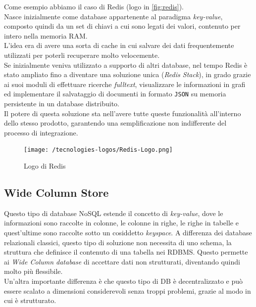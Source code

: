 \noindent Come esempio abbiamo il caso di Redis \cite{site:udemyredis} (logo in \autoref{fig:redis}).\\
Nasce inizialmente come database appartenente al paradigma \textit{key-value}, composto quindi da un set di chiavi a cui sono legati dei valori, contenuto per intero nella memoria RAM.\\
L'idea era di avere una sorta di cache in cui salvare dei dati frequentemente utilizzati per poterli recuperare molto velocemente.\\
Se inizialmente veniva utilizzato a supporto di altri database, nel tempo Redis è stato ampliato fino a diventare una soluzione unica (\textit{Redis Stack}), in grado grazie ai suoi moduli di effettuare ricerche \textit{fulltext}, visualizzare le informazioni in grafi ed implementare il salvataggio di documenti in formato \texttt{JSON} su memoria persistente in un \gls{database distribuito}.\\
Il potere di questa soluzione sta nell'avere tutte queste funzionalità all'interno dello stesso prodotto, garantendo una semplificazione non indifferente del processo di integrazione.

\begin{figure}[htbp]
\begin{center}
\texttt{[image: /tecnologies-logos/Redis-Logo.png]}
\caption{Logo di Redis}
\label{fig:redis}
\end{center}
\end{figure}

\subsection{Wide Column Store}
Questo tipo di database NoSQL estende il concetto di \textit{key-value}, dove le informazioni sono raccolte in colonne, le colonne in righe, le righe in tabelle e quest'ultime sono raccolte sotto un cosiddetto \textit{keyspace}. A differenza dei database relazionali classici, questo tipo di soluzione non necessita di uno schema, la struttura che definisce il contenuto di una tabella nei RDBMS. Questo permette ai \textit{Wide Column database} di accettare dati non strutturati, diventando quindi molto più flessibile.\\
Un'altra importante differenza è che questo tipo di DB è decentralizzato e può essere scalato a dimensioni considerevoli senza troppi problemi, grazie al modo in cui è strutturato.\\

